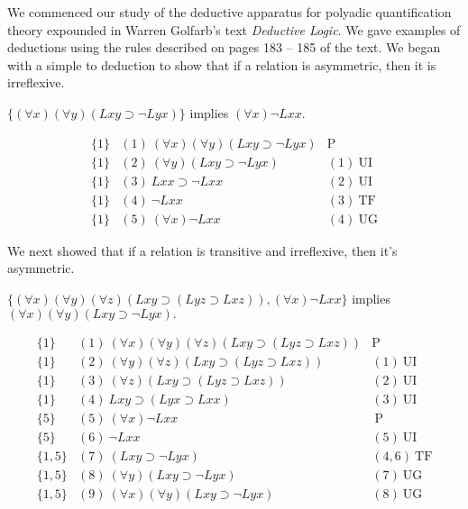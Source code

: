 We commenced our study of the deductive apparatus for polyadic quantification theory expounded in Warren Golfarb's text \emph{Deductive Logic}. We gave examples of deductions using the rules described on pages 183 -- 185 of the text.
We began with a simple to deduction to show that if a relation is asymmetric, then it is irreflexive.
\begin{center}
$\{(\forall x)(\forall y)(Lxy\supset\neg Lyx)\}$ implies $(\forall x)\neg Lxx.$
\end{center}
\[
\begin{array}{lll}
\{1\}   & (1)\  (\forall x)(\forall y)(Lxy\supset\neg Lyx) &  \mathrm{P}\\
\{1\}   & (2)\ (\forall y)(Lxy\supset\neg Lyx) & (1) \ \mathrm{UI}\\
\{1\}   & (3)\ Lxx\supset\neg Lxx &  (2)\ \mathrm{UI}\\
\{1\}   & (4)\ \neg Lxx   & (3)\ \mathrm{TF}\\
\{1\}   & (5)\ (\forall x) \neg Lxx  & (4)\ \mathrm{UG}
\end{array}
\]

We next showed that if a relation is transitive and irreflexive, then it's asymmetric.
\begin{center}
$\{(\forall x)(\forall y)(\forall z)(Lxy\supset(Lyz\supset Lxz)), (\forall x)\neg Lxx\}$ implies $(\forall x)(\forall y)(Lxy\supset\neg Lyx).$
\end{center}
\[
\begin{array}{lll}
\{1\}   & (1)\  (\forall x)(\forall y)(\forall z)(Lxy\supset(Lyz\supset Lxz)) &  \mathrm{P}\\
\{1\}   & (2)\ (\forall y)(\forall z)(Lxy\supset(Lyz\supset Lxz)) & (1) \ \mathrm{UI}\\
\{1\}   & (3)\ (\forall z)(Lxy\supset(Lyz\supset Lxz)) &  (2)\ \mathrm{UI}\\
\{1\}   & (4)\ Lxy\supset(Lyx\supset Lxx)   & (3)\ \mathrm{UI}\\
\{5\}   & (5)\ (\forall x) \neg Lxx  & \ \mathrm{P}\\
\{5\}   & (6)\ \neg Lxx  & (5)\ \mathrm{UI}\\
\{1,5\}   & (7)\ (Lxy\supset\neg Lyx)  & (4,6)\ \mathrm{TF}\\
\{1,5\}   & (8)\ (\forall y)(Lxy\supset\neg Lyx)  & (7)\ \mathrm{UG}\\
\{1,5\}   & (9)\ (\forall x)(\forall y)(Lxy\supset\neg Lyx)  & (8)\ \mathrm{UG}
\end{array}
\]
\fi

